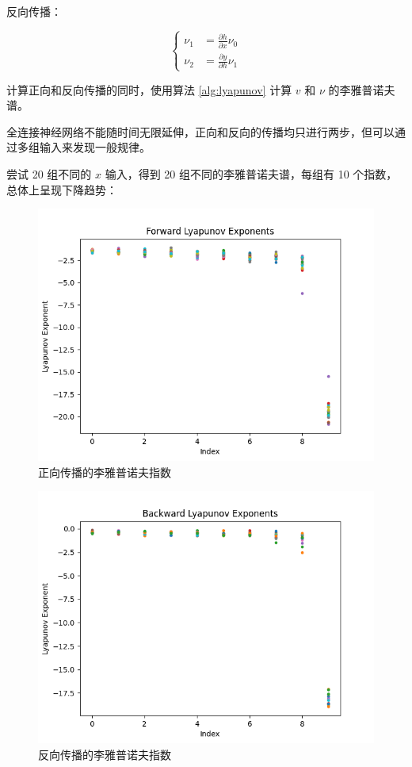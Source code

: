 反向传播：

\begin{equation}
  \left\{
    \begin{aligned}
      \nu_1 &= \frac{\partial h}{\partial x} \nu_0 \\
      \nu_2 &= \frac{\partial y}{\partial h} \nu_1
    \end{aligned}
  \right.
\end{equation}

计算正向和反向传播的同时，使用算法 \ref{alg:lyapunov} 计算 $v$ 和 $\nu$ 的李雅普诺夫谱。

全连接神经网络不能随时间无限延伸，正向和反向的传播均只进行两步，但可以通过多组输入来发现一般规律。

尝试 20 组不同的 $x$ 输入，得到 20 组不同的李雅普诺夫谱，每组有 10 个指数，总体上呈现下降趋势：

\begin{figure}[htbp]
  \centering
  \includegraphics[width=1\textwidth]{figures/forward_lyapunov.png}
  \caption{正向传播的李雅普诺夫指数}
  \label{fig:nn_lyapunov_exponents}
\end{figure}

\begin{figure}[htbp]
  \centering
  \includegraphics[width=1\textwidth]{figures/backward_lyapunov.png}
  \caption{反向传播的李雅普诺夫指数}
  \label{fig:nn_lyapunov_exponents}
\end{figure}

